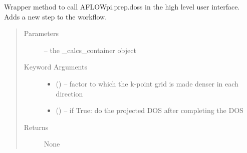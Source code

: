\documentclass[letterpaper,10pt,english]{sphinxmanual}
\begin{document}
\begin{fulllineitems}
\begin{fulllineitems}
\label{\detokenize{prep:prep.calcs_container.dos}}
Wrapper method to call AFLOWpi.prep.doss in the high level user interface.
Adds a new step to the workflow.
\begin{quote}\begin{description}
\item[{Parameters}] \leavevmode
{} -- the \_calcs\_container object

\item[{Keyword Arguments}] \leavevmode\begin{itemize}
\item {} 
 () -- factor to which the k-point grid is made denser in each direction

\item {} 
 () -- if True: do the projected DOS after completing the DOS

\end{itemize}

\item[{Returns}] \leavevmode
None

\end{description}\end{quote}

\end{fulllineitems}


\begin{fulllineitems}
\label{\detokenize{prep:prep.calcs_container.elastic}}
\end{fulllineitems}


\begin{fulllineitems}
\label{\detokenize{prep:prep.calcs_container.evCurve_min}}
\end{fulllineitems}



\end{fulllineitems}
\end{document}
